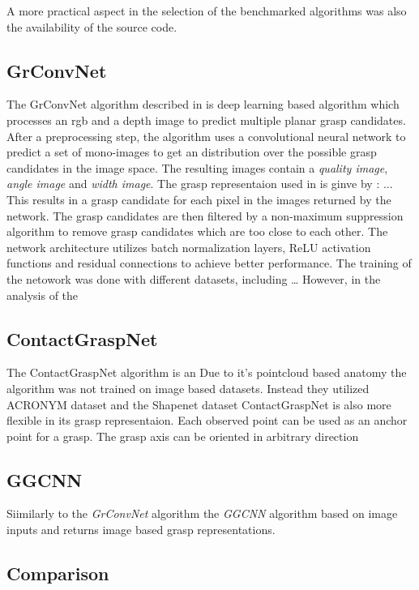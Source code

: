 A more practical aspect in the selection of the benchmarked algorithms was also the availability of the source code.

\subsection{GrConvNet}
The GrConvNet algorithm described in \cite{} is deep learning based algorithm which processes an rgb and a depth image to predict multiple planar grasp candidates.
After a preprocessing step, the algorithm uses a convolutional neural network to predict a set of mono-images to get an distribution over the possible grasp candidates in the image space.
The resulting images contain a \textit{quality image}, \textit{angle image} and \textit{width image}.
The grasp representaion used in \cite{} is ginve by : ...
This results in a grasp candidate for each pixel in the images returned by the network.
The grasp candidates are then filtered by a non-maximum suppression algorithm to remove grasp candidates which are too close to each other.
The network architecture utilizes batch normalization layers, ReLU activation functions and residual connections to achieve better performance.
The training of the netowork was done with different datasets, including \dots
However, in the analysis of the
\subsection{ContactGraspNet}
The ContactGraspNet algorithm is an
Due to it's pointcloud based anatomy the algorithm was not trained on image based datasets.
Instead they utilized ACRONYM dataset and the Shapenet dataset
ContactGraspNet is also more flexible in its grasp representaion. Each observed point can be used as an anchor point for a grasp.
The grasp axis can be oriented in arbitrary direction
\subsection{GGCNN}
Siimilarly to the \textit{GrConvNet} algorithm the \textit{GGCNN} algorithm based on image inputs and returns image based grasp representations.
\subsection{Comparison}
